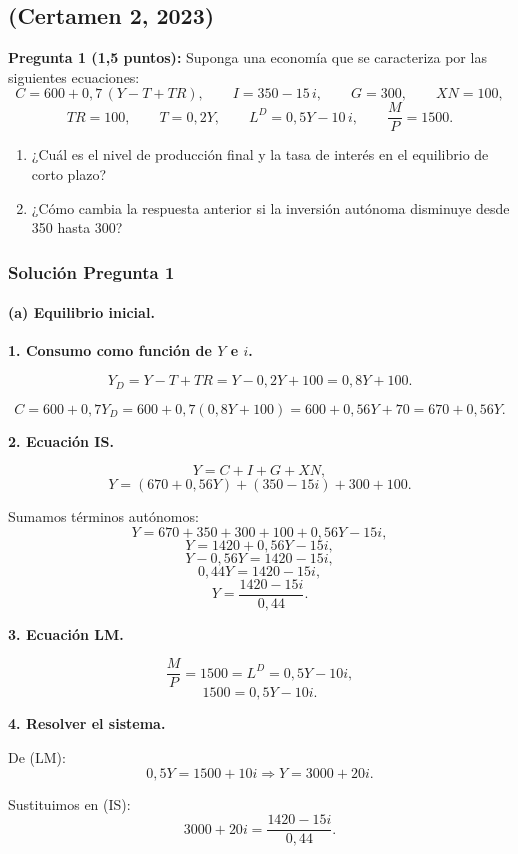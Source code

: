 \documentclass[11pt,addpoints]{article}
\begin{document}
\subsection*{(Certamen 2, 2023)}

\textbf{Pregunta 1 (1{,}5 puntos):}  
Suponga una economía que se caracteriza por las siguientes ecuaciones:
\[
C = 600 + 0{,}7\,(Y - T + TR), \qquad
I = 350 - 15\,i, \qquad
G = 300, \qquad
XN = 100,
\]
\[
TR = 100, \qquad
T = 0{,}2Y, \qquad
L^D = 0{,}5Y - 10\,i, \qquad
\frac{M}{P} = 1500.
\]
\begin{enumerate}[label=\alph*)]
    \item ¿Cuál es el nivel de producción final y la tasa de interés en el equilibrio de corto plazo?  
    \item ¿Cómo cambia la respuesta anterior si la inversión autónoma disminuye desde 350 hasta 300?
\end{enumerate}

\subsubsection*{Solución Pregunta 1}

\paragraph{(a) Equilibrio inicial.}

\textbf{1. Consumo como función de $Y$ e $i$.}

\[
Y_D = Y - T + TR = Y - 0{,}2Y + 100 = 0{,}8Y + 100.
\]

\[
C = 600 + 0{,}7 Y_D = 600 + 0{,}7(0{,}8Y + 100) = 600 + 0{,}56Y + 70 = 670 + 0{,}56Y.
\]

\textbf{2. Ecuación IS.}

\[
Y = C + I + G + XN,
\]
\[
Y = (670 + 0{,}56Y) + (350 - 15i) + 300 + 100.
\]

Sumamos términos autónomos:
\[
Y = 670 + 350 + 300 + 100 + 0{,}56Y - 15i,
\]
\[
Y = 1420 + 0{,}56Y - 15i,
\]
\[
Y - 0{,}56Y = 1420 - 15i,
\]
\[
0{,}44Y = 1420 - 15i,
\]
\[
Y = \frac{1420 - 15i}{0{,}44}. \tag{IS}
\]

\textbf{3. Ecuación LM.}

\[
\frac{M}{P} = 1500 = L^D = 0{,}5Y - 10i,
\]
\[
1500 = 0{,}5Y - 10i. \tag{LM}
\]

\textbf{4. Resolver el sistema.}

De (LM):
\[
0{,}5Y = 1500 + 10i \Rightarrow Y = 3000 + 20i.
\]

Sustituimos en (IS):
\[
3000 + 20i = \frac{1420 - 15i}{0{,}44}.
\]
\end{document}
